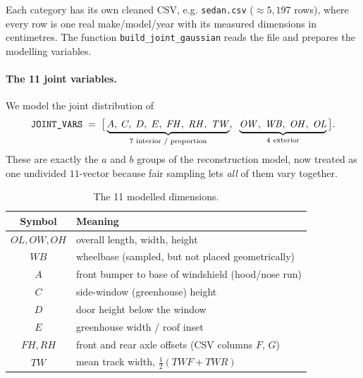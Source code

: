 \documentclass[11pt]{article}
\newcommand{\OL}{\mathit{OL}}
\newcommand{\OW}{\mathit{OW}}
\newcommand{\OH}{\mathit{OH}}
\newcommand{\WB}{\mathit{WB}}
\newcommand{\TW}{\mathit{TW}}
\newcommand{\FH}{\mathit{FH}}
\newcommand{\RH}{\mathit{RH}}
\theoremstyle{definition}
\begin{document}
Each category has its own cleaned CSV, e.g. \texttt{sedan.csv} ($\approx 5{,}197$ rows), where every row is one real make/model/year with its measured dimensions in centimetres. The function \texttt{build\_joint\_gaussian} reads the file and prepares the modelling variables.

\paragraph{The 11 joint variables.} We model the joint distribution of
\begin{equation}
\text{\texttt{JOINT\_VARS}} \;=\; \big[\underbrace{A,\;C,\;D,\;E,\;\FH,\;\RH,\;\TW}_{\text{7 interior / proportion}},\;\;\underbrace{\OW,\;\WB,\;\OH,\;\OL}_{\text{4 exterior}}\big].
\end{equation}
These are exactly the $a$ and $b$ groups of the reconstruction model, now treated as one undivided $11$-vector because fair sampling lets \emph{all} of them vary together.

\begin{table}[H]
\centering
\begin{tabular}{cl}
\toprule
\textbf{Symbol} & \textbf{Meaning} \\
\midrule
$\OL,\OW,\OH$ & overall length, width, height \\
$\WB$         & wheelbase (sampled, but not placed geometrically) \\
$A$           & front bumper to base of windshield (hood/nose run) \\
$C$           & side-window (greenhouse) height \\
$D$           & door height below the window \\
$E$           & greenhouse width / roof inset \\
$\FH,\RH$     & front and rear axle offsets (CSV columns $F$, $G$) \\
$\TW$         & mean track width, $\tfrac{1}{2}(TWF+TWR)$ \\
\bottomrule
\end{tabular}
\caption{The 11 modelled dimensions.}
\end{table}
\end{document}
